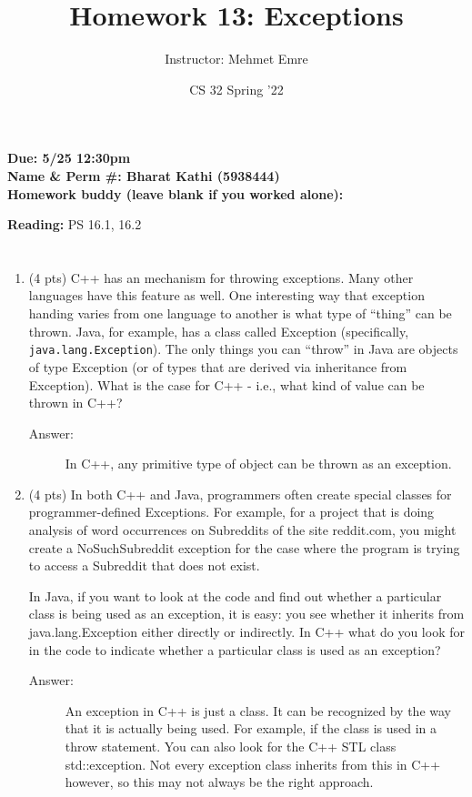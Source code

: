 \documentclass[11pt]{article}
\author{Instructor: Mehmet Emre}
\date{CS 32 Spring '22}
\title{Homework 13: Exceptions}
\begin{document}
\maketitle
\textbf{Due: 5/25 12:30pm} \\ 
\vspace{1em}
\textbf{Name \& Perm \#: Bharat Kathi (5938444)} \\ 
\textbf{Homework buddy (leave blank if you worked alone):}

\textbf{Reading:} PS 16.1, 16.2


\section{}
\label{sec:org6d0c99b}

\begin{enumerate}
\item (4 pts) C++ has an mechanism for throwing exceptions. Many other
languages have this feature as well. One interesting way that exception
handing varies from one language to another is what type of “thing” can
be thrown. Java, for example, has a class called Exception
(specifically, \texttt{java.lang.Exception}). The only things you can “throw” in
Java are objects of type Exception (or of types that are derived via
inheritance from Exception). What is the case for C++ - i.e., what kind
of value can be thrown in C++?

\begin{description}
    \item[Answer:] In C++, any primitive type of object can be thrown as an exception.
\end{description}

\vspace{4em}

\item (4 pts) In both C++ and Java, programmers often create special classes
for programmer-defined Exceptions. For example, for a project that is
doing analysis of word occurrences on Subreddits of the site reddit.com,
you might create a NoSuchSubreddit exception for the case where the
program is trying to access a Subreddit that does not exist.

In Java, if you want to look at the code and find out whether a
particular class is being used as an exception, it is easy: you see
whether it inherits from java.lang.Exception either directly or
indirectly. In C++ what do you look for in the code to indicate whether
a particular class is used as an exception?

\begin{description}
    \item[Answer:] An exception in C++ is just a class. It can be recognized by the way that it is actually being used. For example, if the class is used in a throw statement. You can also look for the C++ STL class std::exception. Not every exception class inherits from this in C++ however, so this may not always be the right approach.
\end{description}

\newpage
\end{enumerate}
\end{document}
